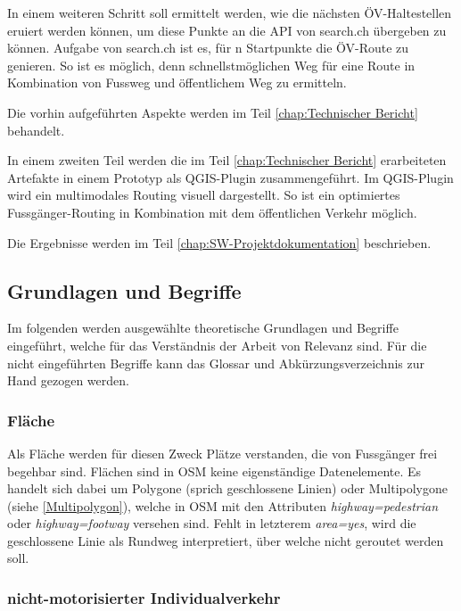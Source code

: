 In einem weiteren Schritt soll ermittelt werden, wie die nächsten ÖV-Haltestellen eruiert werden können, um diese Punkte an die API von search.ch \cite{search_ch_route_api} übergeben zu können. Aufgabe von search.ch ist es, für n Startpunkte die ÖV-Route zu genieren. So ist es möglich, denn schnellstmöglichen Weg für eine Route in Kombination von Fussweg und öffentlichem Weg zu ermitteln.

Die vorhin aufgeführten Aspekte werden im Teil \ref{chap:Technischer Bericht} behandelt.

In einem zweiten Teil werden die im Teil \ref{chap:Technischer Bericht} erarbeiteten Artefakte in einem Prototyp als QGIS-Plugin zusammengeführt. Im QGIS-Plugin wird ein multimodales Routing visuell dargestellt. So ist ein optimiertes Fussgänger-Routing in Kombination mit dem öffentlichen Verkehr möglich.

Die Ergebnisse werden im Teil \ref{chap:SW-Projektdokumentation} beschrieben.

\subsection{Grundlagen und Begriffe}
\label{Grundlagen und Begriffe}

Im folgenden werden ausgewählte theoretische Grundlagen und Begriffe eingeführt, welche für das Verständnis der Arbeit von Relevanz sind. Für die nicht eingeführten Begriffe kann das Glossar und Abkürzungsverzeichnis zur Hand gezogen werden.

\subsubsection{Fläche}
\label{Fläche}

Als Fläche werden für diesen Zweck Plätze verstanden, die von Fussgänger frei begehbar sind. Flächen sind in \ac{OSM} keine eigenständige Datenelemente. Es handelt sich dabei um Polygone (sprich geschlossene Linien) oder Multipolygone (siehe \ref{Multipolygon}), welche in \ac{OSM} mit den Attributen \textit{highway=pedestrian} oder \textit{highway=footway} versehen sind. Fehlt in letzterem \textit{area=yes}, wird die geschlossene Linie als Rundweg interpretiert, über welche nicht geroutet werden soll. \cite{osm_wiki_area}

\subsubsection{nicht-motorisierter Individualverkehr}
\label{nicht-motorisierter Individualverkehr}

